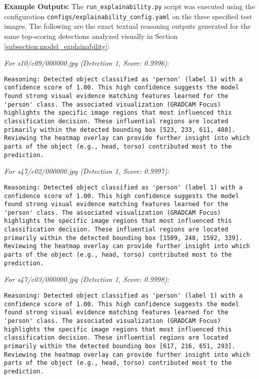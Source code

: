 \textbf{Example Outputs:}
The \texttt{run\_explainability.py} script was executed using the configuration \texttt{configs/explainability\_config.yaml} on the three specified test images. The following are the exact textual reasoning outputs generated for the same top-scoring detections analyzed visually in Section \ref{subsection:model_explainability}:

\textit{For s10/c09/000000.jpg (Detection 1, Score: 0.9996):}
\begin{verbatim}
Reasoning: Detected object classified as 'person' (label 1) with a 
confidence score of 1.00. This high confidence suggests the model 
found strong visual evidence matching features learned for the 
'person' class. The associated visualization (GRADCAM Focus) 
highlights the specific image regions that most influenced this 
classification decision. These influential regions are located 
primarily within the detected bounding box [523, 233, 611, 488]. 
Reviewing the heatmap overlay can provide further insight into which 
parts of the object (e.g., head, torso) contributed most to the 
prediction.
\end{verbatim}

\textit{For s47/c02/000000.jpg (Detection 1, Score: 0.9997):}
\begin{verbatim}
Reasoning: Detected object classified as 'person' (label 1) with a 
confidence score of 1.00. This high confidence suggests the model 
found strong visual evidence matching features learned for the 
'person' class. The associated visualization (GRADCAM Focus) 
highlights the specific image regions that most influenced this 
classification decision. These influential regions are located 
primarily within the detected bounding box [1509, 248, 1592, 339]. 
Reviewing the heatmap overlay can provide further insight into which 
parts of the object (e.g., head, torso) contributed most to the 
prediction.
\end{verbatim}

\textit{For s47/c03/000000.jpg (Detection 1, Score: 0.9998):}
\begin{verbatim}
Reasoning: Detected object classified as 'person' (label 1) with a 
confidence score of 1.00. This high confidence suggests the model 
found strong visual evidence matching features learned for the 
'person' class. The associated visualization (GRADCAM Focus) 
highlights the specific image regions that most influenced this 
classification decision. These influential regions are located 
primarily within the detected bounding box [617, 216, 651, 293]. 
Reviewing the heatmap overlay can provide further insight into which 
parts of the object (e.g., head, torso) contributed most to the 
prediction.
\end{verbatim}

